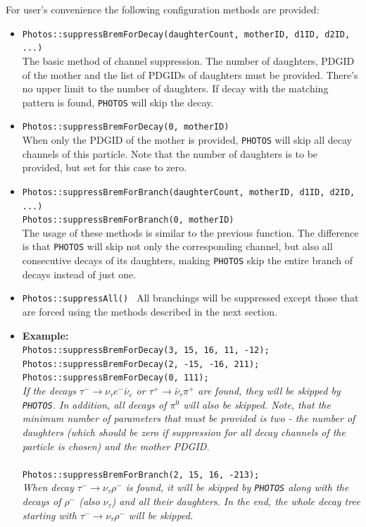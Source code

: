 \documentclass[]{Photos_interface_design}
\begin{document}
For user's convenience the following configuration methods are provided:
\begin{itemize}
 \item {\tt Photos::suppressBremForDecay(daughterCount, motherID, d1ID, d2ID, ...)} \hfill \\
       The basic method of channel suppression. The number of daughters,
	   PDGID of the mother and the list of PDGIDs of daughters must be provided.
	   There's no upper limit to the number of daughters.
	   If decay with the matching pattern is found, {\tt PHOTOS} will skip the decay.
 \item {\tt Photos::suppressBremForDecay(0, motherID)} \hfill \\
       When only the PDGID of the mother is provided, {\tt PHOTOS} will skip all decay channels
	   of this particle. Note that the number of daughters is to be provided,
	   but  set for  this case to zero.
 \item {\tt Photos::suppressBremForBranch(daughterCount, motherID, d1ID, d2ID, ...)} \hfill \\
       {\tt Photos::suppressBremForBranch(0, motherID)} \hfill \\
       The usage of these methods is similar to the previous function. The difference is
	   that {\tt PHOTOS} will skip not only the corresponding channel,
	   but also all consecutive decays of its daughters, making {\tt PHOTOS} skip the entire branch
	   of decays instead of just one.
 \item {\tt Photos::suppressAll() }
       All branchings will be suppressed except those that are forced using the methods
	   described in the next section.
 \item \textbf{Example:} \hfill \\
{\tt Photos::suppressBremForDecay(3, 15, 16, 11, -12); } \\
{\tt Photos::suppressBremForDecay(2, -15, -16, 211); } \\
{\tt Photos::suppressBremForDecay(0, 111); } \\
\emph{If the decays $\tau^- \rightarrow \nu_\tau e^- \bar \nu_e$ or
      $\tau^+ \rightarrow \bar \nu_\tau \pi^+$ are found, they will be skipped by {\tt PHOTOS}.
	  In addition, all decays of $\pi^0$ will also be skipped. Note, that the minimum
	  number of parameters that must be provided is two - the number of daughters
	  (which should be zero if suppression for all decay channels of the particle is chosen) 
	  and the mother PDGID.} \\ \\
{\tt Photos::suppressBremForBranch(2, 15, 16, -213); } \\
\emph{When decay $\tau^- \rightarrow \nu_\tau \rho^-$ is found, it will be skipped by
      {\tt PHOTOS} along with the decays of   $\rho^-$ 
(also $\nu_\tau$) and all
	  their daughters. In the end, the whole decay tree starting with
	  $\tau^- \rightarrow \nu_\tau \rho^-$ will be skipped.}
\end{itemize}
\end{document}
